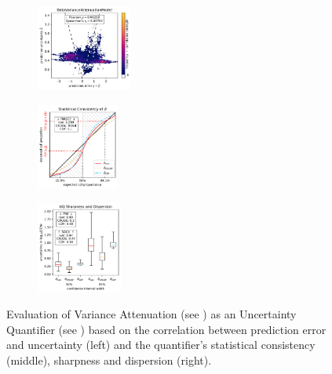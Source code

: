 \begin{figure}[H]
    \begin{subfigure}
    \centering
    \includegraphics[width=0.345\textwidth,valign=t]{uncertainty/figures/uq.betavarianceattenuationmodel-correlation.pdf}
    \end{subfigure}
    \begin{subfigure}
    \centering
    \includegraphics[width=0.297\textwidth,valign=t]{uncertainty/figures/uq.betavarianceattenuationmodel-consistency.pdf}
    \end{subfigure}
    \begin{subfigure}
    \centering
    \includegraphics[width=0.308\textwidth,valign=t]{uncertainty/figures/uq.betavarianceattenuationmodel-sharpness.pdf}
    \end{subfigure}
   
    \vspace{-1em}
    \caption[Evaluation of Variance Attenuation as an Uncertainty Quantifier]{Evaluation of Variance Attenuation (see ) as an Uncertainty Quantifier (see ) based on the correlation between prediction error and uncertainty (left) and the quantifier's statistical consistency (middle), sharpness and dispersion (right).}
    \label{fig:uncertainty-beta-nll}
\end{figure}

